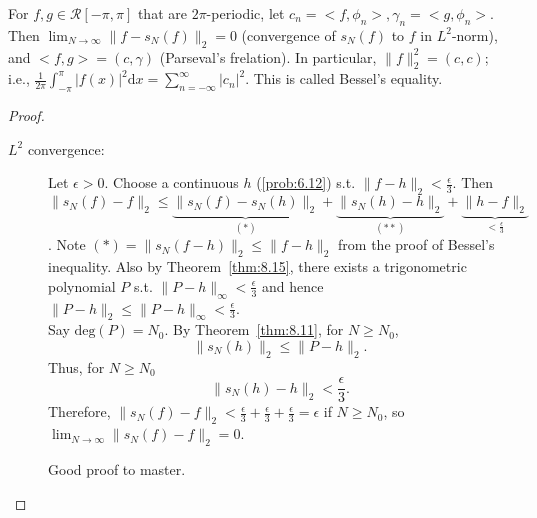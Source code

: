\begin{thm}[16]
	For $f,g \in \mathscr{R}[-\pi,\pi]$ that are $2\pi$-periodic,
	let $c_n= <f, \phi_n>, \gamma_n = < g, \phi_n>$.
	Then $\lim_{N\to \infty}{\|f-s_N(f)\|_2}=0$ (convergence of $s_N(f)$ to $f$ in $L^2$-norm), and $<f,g> = (c,\gamma)$ (Parseval's frelation).
	In particular, $\|f\|_2^{2}=(c,c)$; i.e., $\frac{1}{2\pi}\int_{-\pi}^{\pi}{\left|f(x)\right|^2\mathrm{d}x}=\sum_{n=-\infty}^{\infty}{\left|c_n\right|^2}$.
	This is called Bessel's equality.
	\begin{proof}
		\begin{description}
			\item[$L^2$ convergence:]
			      Let $\epsilon>0$. Choose a continuous $h$ (\ref{prob:6.12}) s.t. $\|f-h\|_2 < \frac{\epsilon}{3}$.
			      Then $\|s_N(f)-f\|_{2}\le \underbrace{\|s_N(f)-s_N(h)\|_2}_{(*)}+\underbrace{\|s_N(h)-h\|_{2}}_{(**)}+\underbrace{\|h-f\|_2}_{<\frac{\epsilon}{3}}$.
			      Note $(*)= \|s_N(f-h)\|_2 \le \|f-h\|_2$ from the proof of Bessel's inequality.
			      Also by Theorem~\ref{thm:8.15}, there exists a trigonometric polynomial $P$ s.t. $\|P-h\|_{\infty}<\frac{\epsilon}{3}$ and hence $\|P-h\|_2 \le  \|P-h\|_{\infty}<\frac{\epsilon}{3}$.\\
			      Say $\text{deg}(P)=N_{0}$. By Theorem~\ref{thm:8.11},
			      for $N\ge N_{0}$, \[
				      \|s_N(h)\|_{2}\le \|P-h\|_2
				      .\]
			      Thus, for $N\ge N_{0}$\[
				      \|s_N(h)-h\|_{2} < \frac{\epsilon}{3}
				      .\]
			      Therefore, $\|s_N(f)-f\|_2<\frac{\epsilon}{3}+\frac{\epsilon}{3}+\frac{\epsilon}{3}=\epsilon$ if $N\ge N_{0}$, so $\lim_{N\to \infty}{\|s_N(f)-f\|_2}=0$.
			      \begin{remark}
				      Good proof to master.
			      \end{remark}


\end{description}
\end{proof}
\end{thm}
